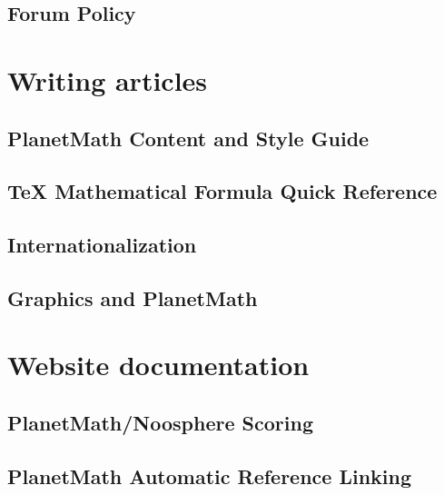 \documentclass[12pt,report]{memoir}
\begin{document}
\section{Forum Policy}


\chapter{Writing articles}

\section{PlanetMath Content and Style Guide}


\section{TeX Mathematical Formula Quick Reference}


\section{Internationalization}


\section{Graphics and PlanetMath}


\chapter{Website documentation}


\section{PlanetMath/Noosphere Scoring}


\section{PlanetMath Automatic Reference Linking}

\end{document}
